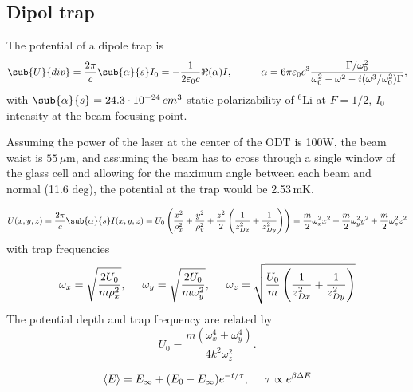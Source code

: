 \subsection*{Dipol trap} 

The potential of a dipole trap is
\begin{equation}
	\sub{U}{dip} = \frac{2\pi}{c} \sub{\alpha}{s} I_0 = -\frac{1}{2 \varepsilon_0 c} \Re(\alpha) I,
	\hspace{10 mm} 
	\alpha = 6 \pi \varepsilon_0 c^3 \frac{\Gamma/\omega_0^2}{\omega_0^2 - \omega^2 - i (\omega^3 / \omega_0^2) \Gamma},
\end{equation}
with $\sub{\alpha}{s} = 24.3 \cdot 10^{-24}\,cm^{3}$ static polarizability of $^{6}$Li at $F = 1/2$, $I_0$ -- intensity at the beam focusing point.


Assuming the power of the laser at the center of the ODT is 100W, the beam waist is $55\, \mu$m, and assuming the beam has to cross through a single window of the glass cell and allowing for the maximum angle between each beam and normal (11.6 deg), the potential at the trap would be 2.53\,mK.


\begin{equation*}
	U(x,y,z) = \frac{2\pi}{c} \sub{\alpha}{s} I(x, y,z) = U_0 \left(
		\frac{x^2}{\rho_x^2} + \frac{y^2}{\rho_y^2} + \frac{z^2}{2} \left(\frac{1}{z_{Dx}^2} + \frac{1}{z_{Dy}^2}\right)
	\right) = \frac{m}{2}\omega_x^2 x^2 + \frac{m}{2} \omega_y^2 y^2 + \frac{m}{2} \omega_z^2 z^2
\end{equation*}
with trap frequencies
\begin{equation*}
	\omega_x = \sqrt{\frac{2U_0}{m \rho_x^2}},
	\hspace{5 mm} 
	\omega_y = \sqrt{\frac{2 U_0}{m \omega_y^2}},
	\hspace{5 mm} 
	\omega_z = \sqrt{\frac{U_0}{m}\left(
		\frac{1}{z_{Dx}^2} + \frac{1}{z_{Dy}^2}
	\right)}
\end{equation*}
The potential depth and trap frequency are related by 
\begin{equation*}
	U_0 = \frac{m(\omega_x^4 + \omega_y^4)}{4 k^2 \omega_z^2}.
\end{equation*}

\begin{equation*}
	\langle E\rangle = E_\infty + (E_0 - E_\infty) e^{-t/\tau}, 
	\hspace{5 mm} 
	\tau \propto e^{\beta \Delta E}
\end{equation*}



